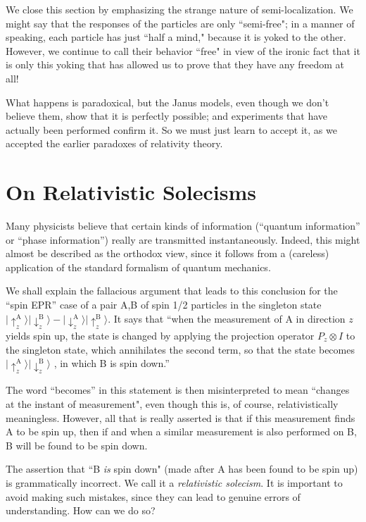 \documentclass[12pt]{amsart}
\newcommand{\ra}{\mathrm A}
\newcommand{\rb}{\mathrm B}
\newcommand{\uA}{\uparrow}
\newcommand{\dA}{\downarrow}
\begin{document}
We close this section by emphasizing the strange nature of semi-localization.
We might say that the responses of the particles are only ``semi-free"; in a manner of speaking, each particle has just ``half a mind," because it is yoked to the other.  
However, we continue to call their behavior ``free" in view of the ironic fact that 
it is only this yoking that has allowed us to prove that they have any freedom at all!  

What happens is paradoxical, but the Janus models, even though we don't believe them,
show that it is perfectly possible; and experiments that have actually been performed  confirm it. So we must just learn to accept it, as we accepted the earlier paradoxes of relativity theory.

\section{On Relativistic Solecisms}

Many physicists believe that certain kinds of information 
(``quantum information'' or ``phase information'') 
really are transmitted instantaneously.  Indeed, this might almost
be described as the orthodox view, since it follows from a (careless) 
application of the standard formalism of quantum mechanics.

We shall explain the fallacious argument that leads to this conclusion for the
``spin EPR'' case of a pair A,B of spin 1/2 particles in the singleton 
state $|\uA^\ra_z \rangle |\dA^\rb_z \rangle - |\dA^\ra_z \rangle|\uA^\rb_z \rangle$. 
It says that ``when the measurement of A in direction $z$ yields spin up, 
the state is changed by applying the projection operator 
$P_z \otimes I$ to the singleton state, which
annihilates the second term, so that the state becomes 
$|\uA^\ra_z \rangle |\dA^\rb_z \rangle$ , in which B is spin down.''

The word ``becomes'' in this statement is then misinterpreted to mean 
``changes at the instant of measurement", even though this is, of course, 
relativistically meaningless.
However, all that is really asserted is that if this measurement finds 
A to be spin up, then if and when a similar measurement is also performed on B, B will be found to be spin down.

The assertion that ``B {\em is} spin down" 
(made after A has been found to be spin up)
is grammatically incorrect.  We call it a {\em relativistic solecism}. 
It is important to avoid making such mistakes, 
since they can lead to genuine errors of understanding.
How can we do so?
\end{document}
